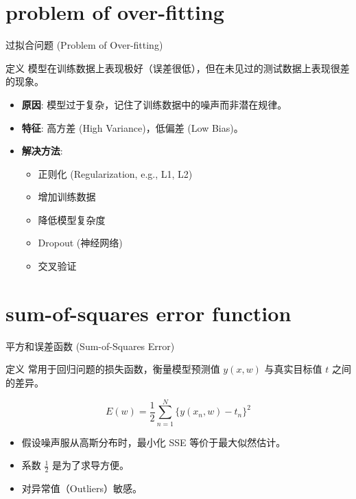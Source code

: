 \documentclass[12pt, t, aspectratio=169]{beamer}
\begin{document}
\section{problem of over-fitting}
\begin{frame}{过拟合问题 (Problem of Over-fitting)}
    \begin{block}{定义}
        模型在训练数据上表现极好（误差很低），但在未见过的测试数据上表现很差的现象。
    \end{block}
    
    \vspace{0.5cm}
    \begin{itemize}
        \item \textbf{原因}: 模型过于复杂，记住了训练数据中的噪声而非潜在规律。
        \item \textbf{特征}: 高方差 (High Variance)，低偏差 (Low Bias)。
        \item \textbf{解决方法}:
        \begin{itemize}
            \item 正则化 (Regularization, e.g., L1, L2)
            \item 增加训练数据
            \item 降低模型复杂度
            \item Dropout (神经网络)
            \item 交叉验证
        \end{itemize}
    \end{itemize}
\end{frame}

\section{sum-of-squares error function}
\begin{frame}{平方和误差函数 (Sum-of-Squares Error)}
    \begin{block}{定义}
        常用于回归问题的损失函数，衡量模型预测值 $y(x, w)$ 与真实目标值 $t$ 之间的差异。
    \end{block}
    
    \begin{equation*}
        E(w) = \frac{1}{2} \sum_{n=1}^{N} \{ y(x_n, w) - t_n \}^2
    \end{equation*}
    
    \vspace{0.5cm}
    \begin{itemize}
        \item 假设噪声服从高斯分布时，最小化 SSE 等价于最大似然估计。
        \item 系数 $\frac{1}{2}$ 是为了求导方便。
        \item 对异常值（Outliers）敏感。
    \end{itemize}
\end{frame}
\end{document}
